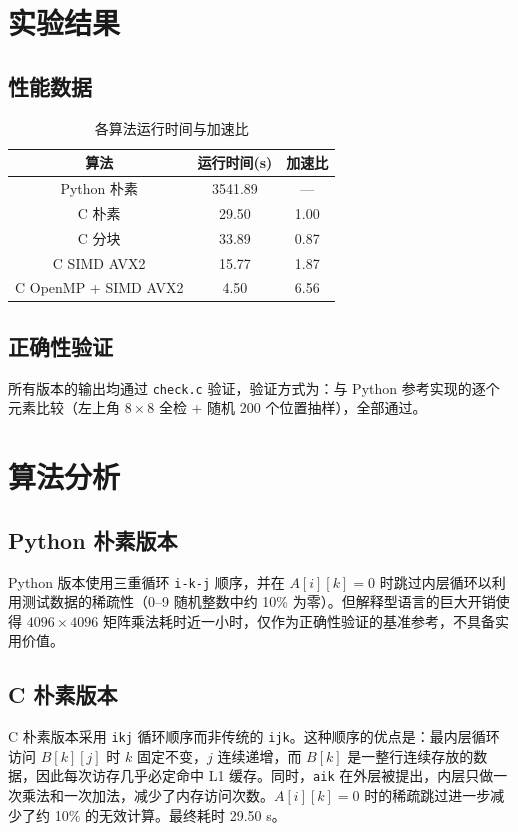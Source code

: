 \documentclass[11pt]{article}
\begin{document}
\section{实验结果}
\subsection{性能数据}

\begin{table}[H]
    \centering
    \begin{tabular}{ccc}\hline
        算法 & 运行时间(s) & 加速比 \\ \hline
        Python 朴素 & 3541.89 & — \\
        C 朴素 & 29.50 & 1.00 \\
        C 分块 & 33.89 & 0.87 \\
        C SIMD AVX2 & 15.77 & 1.87 \\
        C OpenMP + SIMD AVX2 & 4.50 & 6.56 \\ \hline
    \end{tabular}
    \caption{各算法运行时间与加速比}
\end{table}

\subsection{正确性验证}
所有版本的输出均通过 \texttt{check.c} 验证，验证方式为：与 Python 参考实现的逐个元素比较（左上角 $8 \times 8$ 全检 + 随机 200 个位置抽样），全部通过。

\section{算法分析}

\subsection{Python 朴素版本}
Python 版本使用三重循环 \texttt{i-k-j} 顺序，并在 $A[i][k] = 0$ 时跳过内层循环以利用测试数据的稀疏性（0--9 随机整数中约 10\% 为零）。但解释型语言的巨大开销使得 $4096 \times 4096$ 矩阵乘法耗时近一小时，仅作为正确性验证的基准参考，不具备实用价值。

\subsection{C 朴素版本}
C 朴素版本采用 \texttt{ikj} 循环顺序而非传统的 \texttt{ijk}。这种顺序的优点是：最内层循环访问 $B[k][j]$ 时 $k$ 固定不变，$j$ 连续递增，而 $B[k]$ 是一整行连续存放的数据，因此每次访存几乎必定命中 L1 缓存。同时，\texttt{aik} 在外层被提出，内层只做一次乘法和一次加法，减少了内存访问次数。$A[i][k] = 0$ 时的稀疏跳过进一步减少了约 10\% 的无效计算。最终耗时 29.50 s。
\end{document}
